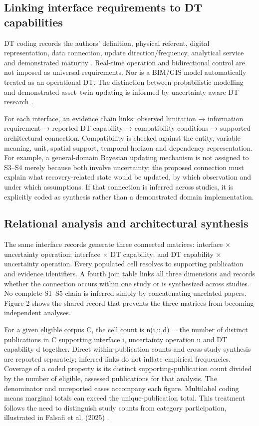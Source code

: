 \subsection{Linking interface requirements to DT capabilities}
DT coding records the authors' definition, physical referent, digital representation, data connection, update direction/frequency, analytical service and demonstrated maturity \citep{I27,I26,I31}. Real-time operation and bidirectional control are not imposed as universal requirements. Nor is a BIM/GIS model automatically treated as an operational DT. The distinction between probabilistic modelling and demonstrated asset–twin updating is informed by uncertainty-aware DT research \citep{I33,I32}.

For each interface, an evidence chain links: observed limitation → information requirement → reported DT capability → compatibility conditions → supported architectural connection. Compatibility is checked against the entity, variable meaning, unit, spatial support, temporal horizon and dependency representation. For example, a general-domain Bayesian updating mechanism is not assigned to S3–S4 merely because both involve uncertainty; the proposed connection must explain what recovery-related state would be updated, by which observation and under which assumptions. If that connection is inferred across studies, it is explicitly coded as synthesis rather than a demonstrated domain implementation.

\subsection{Relational analysis and architectural synthesis}
The same interface records generate three connected matrices: interface × uncertainty operation; interface × DT capability; and DT capability × uncertainty operation. Every populated cell resolves to supporting publication and evidence identifiers. A fourth join table links all three dimensions and records whether the connection occurs within one study or is synthesized across studies. No complete S1–S5 chain is inferred simply by concatenating unrelated papers. Figure 2 shows the shared record that prevents the three matrices from becoming independent analyses.

For a given eligible corpus C, the cell count is n(i,u,d) = the number of distinct publications in C supporting interface i, uncertainty operation u and DT capability d together. Direct within-publication counts and cross-study synthesis are reported separately; inferred links do not inflate empirical frequencies. Coverage of a coded property is its distinct supporting-publication count divided by the number of eligible, assessed publications for that analysis. The denominator and unreported cases accompany each figure. Multilabel coding means marginal totals can exceed the unique-publication total. This treatment follows the need to distinguish study counts from category participation, illustrated in Falsafi et al. (2025) \citep{M03}.

